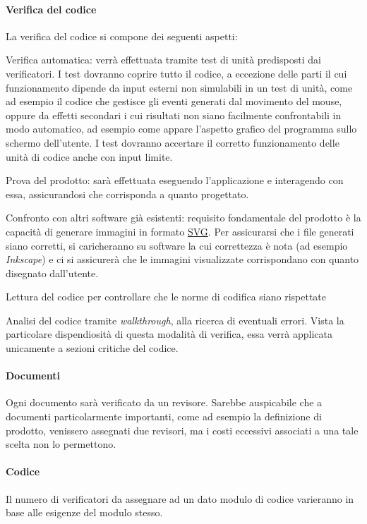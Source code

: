 \paragraph{Verifica del codice}
La verifica del codice si compone dei seguenti aspetti:
\begin{elenconumerato}[\textbf{}]{\subsubsecindent}
\item Verifica automatica: verr\`a effettuata tramite test di unit\`a predisposti dai verificatori. I test dovranno coprire tutto il codice, a eccezione delle parti il cui funzionamento dipende da input esterni non simulabili in un test di unit\`a, come ad esempio il codice che gestisce gli eventi generati dal movimento del mouse, oppure da effetti secondari i cui risultati non siano facilmente confrontabili in modo automatico, ad esempio come appare l'aspetto grafico del programma sullo schermo dell'utente. I test dovranno accertare il corretto funzionamento delle unit\`a di codice anche con input limite.
\item Prova del prodotto: sar\`a effettuata eseguendo l'applicazione e interagendo con essa, assicurandosi che corrisponda a quanto progettato.
\item Confronto con altri software gi\`a esistenti: requisito fondamentale del prodotto \`e la capacit\`a di generare immagini in formato \underline{SVG}. Per assicurarsi che i file generati siano corretti, si caricheranno su software la cui correttezza \`e nota (ad esempio \textit{Inkscape}) e ci si assicurer\`a che le immagini visualizzate corrispondano con quanto disegnato dall'utente. 
\item Lettura del codice per controllare che le norme di codifica siano rispettate
\item Analisi del codice tramite \textit{walkthrough}, alla ricerca di eventuali errori. Vista la particolare dispendiosit\`a di questa modalit\`a di verifica, essa verr\`a applicata unicamente a sezioni critiche del codice.
\end{elenconumerato}


\paragraph{Documenti} Ogni documento sar\`a verificato da un revisore. Sarebbe auspicabile che a documenti particolarmente importanti, come ad esempio la definizione di prodotto, venissero assegnati due revisori, ma i costi eccessivi associati a una tale scelta non lo permettono.
\paragraph{Codice} Il numero di verificatori da assegnare ad un dato modulo di codice varieranno in base alle esigenze del modulo stesso.

